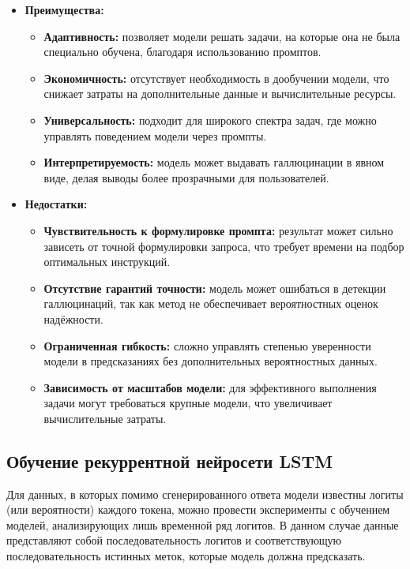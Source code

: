 \documentclass[12pt]{article}
\begin{document}
\begin{itemize}
    \item \textbf{Преимущества:}
    \begin{itemize}
        \item \textbf{Адаптивность:} позволяет модели решать задачи, на которые она не была специально обучена, благодаря использованию промптов.
        \item \textbf{Экономичность:} отсутствует необходимость в дообучении модели, что снижает затраты на дополнительные данные и вычислительные ресурсы.
        \item \textbf{Универсальность:} подходит для широкого спектра задач, где можно управлять поведением модели через промпты.
        \item \textbf{Интерпретируемость:} модель может выдавать галлюцинации в явном виде, делая выводы более прозрачными для пользователей.
    \end{itemize}
    
    \item \textbf{Недостатки:}
    \begin{itemize}
        \item \textbf{Чувствительность к формулировке промпта:} результат может сильно зависеть от точной формулировки запроса, что требует времени на подбор оптимальных инструкций.
        \item \textbf{Отсутствие гарантий точности:} модель может ошибаться в детекции галлюцинаций, так как метод не обеспечивает вероятностных оценок надёжности.
        \item \textbf{Ограниченная гибкость:} сложно управлять степенью уверенности модели в предсказаниях без дополнительных вероятностных данных.
        \item \textbf{Зависимость от масштабов модели:} для эффективного выполнения задачи могут требоваться крупные модели, что увеличивает вычислительные затраты.
    \end{itemize}
\end{itemize}

\subsection{Обучение рекуррентной нейросети LSTM}

Для данных, в которых помимо сгенерированного ответа модели известны логиты (или вероятности) каждого токена, можно провести эксперименты с обучением моделей, анализирующих лишь временной ряд логитов. В данном случае данные представляют собой последовательность логитов и соответствующую последовательность истинных меток, которые модель должна предсказать.
\end{document}
